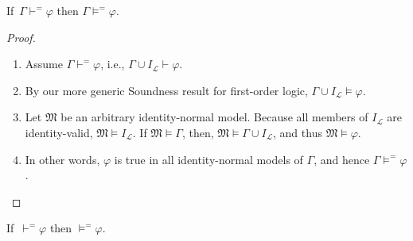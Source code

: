 \documentclass[12pt]{report}
\theoremstyle{nonumberplain}
\newtheorem{proof}{Proof}
\newcommand{\M}{\mathfrak{M}}
\begin{document}
\begin{mt}
If \,$Γ ⊢^{=} φ$ then $Γ ⊨^{=} φ$.
\end{mt}
\begin{proof}
\begin{enumerate}
\item Assume $Γ ⊢^{=} φ$, i.e., $Γ ∪ I_\mathcal{L} ⊢ φ$.
\item By our more generic Soundness result for first-order logic, $Γ ∪ I_\mathcal{L} ⊨ φ$.
\item Let $\M$ be an arbitrary identity-normal model. Because all members of $I_\mathcal{L}$ are identity-valid, $\M ⊨ I_\mathcal{L}$. If $\M ⊨ Γ$, then, $\M ⊨ Γ ∪ I_\mathcal{L}$, and thus $\M ⊨ φ$.
\item In other words, $φ$ is true in all identity-normal models of $Γ$, and hence $Γ ⊨^{=} φ$.
\end{enumerate}
\end{proof}

\begin{coro}
If \,$⊢^{=} φ$ then $⊨^{=} φ$.
\end{coro}
\end{document}

